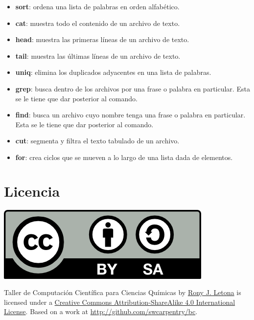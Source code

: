\documentclass[10pt,letterpaper]{article}
\begin{document}
\begin{small}
\begin{itemize}
\item \textbf{sort}: ordena una lista de palabras en orden alfab\'etico.
\item \textbf{cat}: muestra todo el contenido de un archivo de texto.
\item \textbf{head}: muestra las primeras l\'ineas de un archivo de texto.
\item \textbf{tail}: muestra las \'ultimas l\'ineas de un archivo de texto.
\item \textbf{uniq}: elimina los duplicados adyacentes en una lista de palabras.
\item \textbf{grep}: busca dentro de los archivos por una frase o palabra en particular. Esta se le tiene que dar posterior al comando.
\item \textbf{find}: busca un archivo cuyo nombre tenga una frase o palabra en particular. Esta se le tiene que dar posterior al comando.
\item \textbf{cut}: segmenta y filtra el texto tabulado de un archivo.
\item \textbf{for}: crea ciclos que se mueven a lo largo de una lista dada de elementos.
\end{itemize}
\end{small}

\section*{Licencia}

\noindent \includegraphics{img/cc_big.png}

\noindent Taller de Computaci\'on Cient\'ifica para Ciencias Qu\'imicas by \href{http://github.com/zronyj/TC3Q}{Rony J. Letona} is licensed under a \href{http://creativecommons.org/licenses/by-sa/4.0/}{Creative Commons Attribution-ShareAlike 4.0 International License}.
Based on a work at \url{http://github.com/swcarpentry/bc}.
\end{document}
